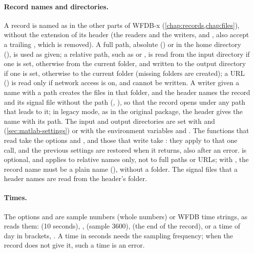 \paragraph{Record names and directories.} A record is named as in the other parts of
WFDB-x (\cref{chap:records,chap:files}), without the  extension of its header
(the readers and the writers,  and
, also accept a trailing , which is removed). A
full path, absolute () or
in the home directory (), is used as given; a
relative path, such as  or , is read from the input
directory if one is set, otherwise from the current folder, and written to the output
directory if one is set, otherwise to the current folder (missing folders are created);
a URL () is read only if network
access is on, and cannot be written. A writer given a name with a path creates the files
in that folder, and the header names the record and its signal file without the path
(, ), so that the record opens under any path that leads to
it; in legacy mode, as in the original package, the header gives the name with its path.
The input and output directories are set with  and
 (\cref{sec:matlab-settings}) or with the
environment variables  and . The
functions that read take the options
 and , and those that write take : they
apply to that one call, and the previous settings are restored when it returns, also after
an error.  is optional, and applies to relative names only, not to full
paths or URLs; with , the record name must be a plain name (),
without a folder. The signal files that a header names are read from the header's
folder.

\paragraph{Times.} The options  and  are sample numbers
(whole numbers) or WFDB time strings, as  reads them:  (10
seconds), ,  (sample 3600),  (the end of the
record), or a time of day in brackets, . A time in seconds needs the
sampling frequency; when the record does not give it, such a time is an error.

